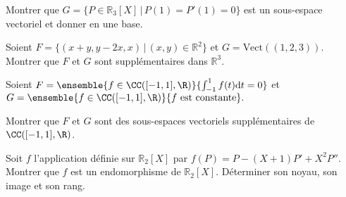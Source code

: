 \documentclass[twoside,a4paper,french,10pt]{VcCours}
\begin{document}
\medskip

\begin{Exercice}
    Montrer que $G = \lbrace P \in \mathbb{R}_3[X] \, \vert \, P(1)=P'(1)=0\rbrace$ est un sous-espace vectoriel et donner en une base.
\end{Exercice} 

\begin{Exercice}
    Soient $F= \lbrace (x+y,y-2x, x) \, \vert \,  (x,y) \in \mathbb{R}^2 \rbrace$ et $G = \textrm{Vect}((1,2,3))$. Montrer que $F$ et $G$ sont supplémentaires dans $\mathbb{R}^3$.
\end{Exercice} 

\begin{Exercice}
    Soient $F = \ensemble{f \in \CC([-1,1],\R)}{\int_{-1}^{1} f(t)\text{d}t = 0}$
    et $G = \ensemble{f\in\CC([-1,1],\R)}{f\text{ est constante}}.$

    Montrer que $F$ et $G$ sont des sous-espaces vectoriels supplémentaires de 
    $\CC([-1,1], \R)$.
\end{Exercice} 

\begin{Exercice}
    Soit $f$ l'application définie sur $\mathbb{R}_2[X]$ par $f(P)=P-(X+1)P'+X^2 P''$. Montrer que $f$ est un endomorphisme de $\mathbb{R}_2[X]$. Déterminer son noyau, son image et son rang.
\end{Exercice} 
\end{document}
